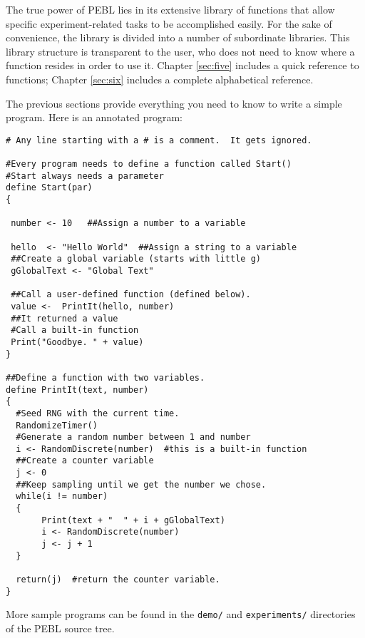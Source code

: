 \vfill
{}

The true power of PEBL lies in its extensive library of
functions that allow specific experiment-related tasks to be
accomplished easily. For the sake of convenience, the library is divided into a number of subordinate libraries.  This library structure
is transparent to the user, who does not need to know where
a function resides in order to use it. Chapter \ref{sec:five} includes a quick reference to functions; Chapter \ref{sec:six} includes a complete alphabetical reference.

\newpage
{}

The previous sections provide everything you need to know to
write a simple program.  Here is an annotated program:

\begin{verbatim}
# Any line starting with a # is a comment.  It gets ignored.

#Every program needs to define a function called Start() 
#Start always needs a parameter
define Start(par)
{

 number <- 10   ##Assign a number to a variable

 hello  <- "Hello World"  ##Assign a string to a variable
 ##Create a global variable (starts with little g)
 gGlobalText <- "Global Text"

 ##Call a user-defined function (defined below).
 value <-  PrintIt(hello, number)
 ##It returned a value
 #Call a built-in function
 Print("Goodbye. " + value)
}

##Define a function with two variables.
define PrintIt(text, number)
{
  #Seed RNG with the current time.
  RandomizeTimer()
  #Generate a random number between 1 and number
  i <- RandomDiscrete(number)  #this is a built-in function
  ##Create a counter variable
  j <- 0
  ##Keep sampling until we get the number we chose.
  while(i != number)
  {
       Print(text + "  " + i + gGlobalText)
       i <- RandomDiscrete(number)
       j <- j + 1
  }

  return(j)  #return the counter variable.
}
\end{verbatim}
More sample programs can be found in the \texttt{demo/} and \texttt{experiments/} directories of the PEBL source tree.


